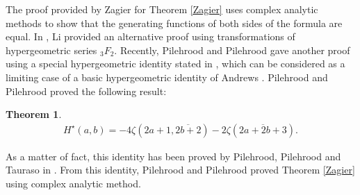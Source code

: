 \documentclass[reqno]{amsart}
\newtheorem{theorem}{Theorem}[section]
\theoremstyle{definition}
\theoremstyle{remark}
\numberwithin{equation}{section}
\begin{document}
The proof provided by Zagier for Theorem \ref{Zagier} uses    complex analytic methods to show that the generating functions of both sides of the formula are equal. In \cite{11}, Li provided an alternative proof using transformations of  hypergeometric series $_3F_2$. Recently, Pilehrood and Pilehrood \cite{3} gave another proof  using a special hypergeometric identity stated in \cite{2}, which can be considered as a limiting case of a basic hypergeometric identity of Andrews \cite{12}.   Pilehrood and Pilehrood \cite{3} proved the following result:
\begin{theorem}\label{Pilehrood}
\begin{align}\label{eq10}H^{\star}(a, b)=-4\zeta\left(2a+1, \overline{2b+2}\right)-2\zeta\left(\overline{2a+2b+3}\right).\end{align}
\end{theorem}
 As a matter of fact, this identity has been proved by Pilehrood, Pilehrood and Tauraso in \cite{16}. From this identity, Pilehrood and Pilehrood \cite{3}  proved  Theorem \ref{Zagier} using complex analytic method.
\end{document}
